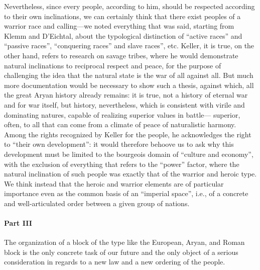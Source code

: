 Nevertheless, since every people, according to him, should be respected according to their own inclinations, we can certainly think that there exist peoples of a warrior race and calling---we noted everything that was said, starting from Klemm and D'Eichtal, about the typological distinction of ``active races'' and ``passive races'', ``conquering races'' and slave races'', etc. Keller, it is true, on the other hand, refers to research on savage tribes, where he would demonstrate natural inclinations to reciprocal respect and peace, for the purpose of challenging the idea that the natural state is the war of all against all. But much more documentation would be necessary to show such a thesis, against which, all the great Aryan history already remains: it is true, not a history of eternal war and for war itself, but history, nevertheless, which is consistent with virile and dominating natures, capable of realizing superior values in battle--- superior, often, to all that can come from a climate of peace of naturalistic harmony. Among the rights recognized by Keller for the people, he acknowledges the right to ``their own development'': it would therefore behoove us to ask why this development must be limited to the bourgeois domain of ``culture and economy'', with the exclusion of everything that refers to the ``power'' factor, where the natural inclination of such people was exactly that of the warrior and heroic type. We think instead that the heroic and warrior elements are of particular importance even as the common basis of an ``imperial space'', i.e., of a concrete and well-articulated order between a given group of nations.

\paragraph{Part III} 

\begin{quotex}
The organization of a block of the type like the European, Aryan, and Roman block is the only concrete task of our future and the only object of a serious consideration in regards to a new law and a new ordering of the people.
\end{quotex}

